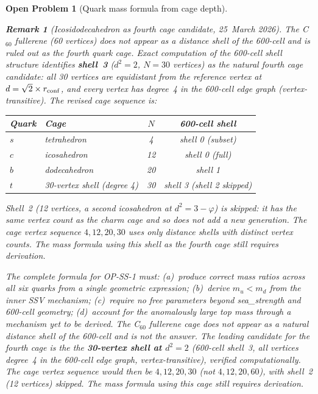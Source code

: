\documentclass[11pt,a4paper]{article}
\newtheorem{remark}[theorem]{Remark}
\newtheorem{openprob}[theorem]{Open Problem}
\newcommand{\phig}{\varphi}
\begin{document}
\begin{openprob}[Quark mass formula from cage depth]
\begin{remark}[Icosidodecahedron as fourth cage candidate, 25~March 2026]
The C$_{60}$ fullerene (60 vertices) does not appear as a distance
shell of the 600-cell and is ruled out as the fourth quark cage.
Exact computation of the 600-cell shell structure identifies
\textbf{shell~3} ($d^2 = 2$, $N = 30$ vertices) as the natural
fourth cage candidate: all 30 vertices are equidistant from the
reference vertex at $d = \sqrt{2}\times r_{\rm conf}$, and every
vertex has degree~4 in the 600-cell edge graph (vertex-transitive).
The revised cage sequence is:
\begin{center}
\renewcommand{\arraystretch}{1.2}
\begin{tabular}{llcc}
\toprule
Quark & Cage & $N$ & 600-cell shell \\
\midrule
$s$ & tetrahedron & 4 & shell 0 (subset) \\
$c$ & icosahedron & 12 & shell 0 (full) \\
$b$ & dodecahedron & 20 & shell 1 \\
$t$ & 30-vertex shell (degree 4) & 30 & shell 3 (shell 2 skipped) \\
\bottomrule
\end{tabular}
\end{center}
Shell~2 (12 vertices, a second icosahedron at $d^2 = 3-\phig$)
is skipped: it has the same vertex count as the charm cage and
so does not add a new generation.  The cage vertex sequence
$4, 12, 20, 30$ uses only distance shells with \emph{distinct}
vertex counts.  The mass formula using this shell as
the fourth cage still requires derivation.
\end{remark}

The complete formula for OP-SS-1 must: (a)~produce correct mass
ratios across all six quarks from a single geometric expression;
(b)~derive $m_u < m_d$ from the inner SSV mechanism; (c)~require
no free parameters beyond sea\_strength and 600-cell geometry;
(d)~account for the anomalously large top mass through a mechanism
yet to be derived.  The C$_{60}$ fullerene cage does not appear
as a natural distance shell of the 600-cell and is not the answer.
The leading candidate for the fourth cage is the
the \textbf{30-vertex shell at $d^2 = 2$} (600-cell shell~3,
all vertices degree~4 in the 600-cell edge graph,
vertex-transitive), verified computationally.  The cage vertex sequence would
then be $4, 12, 20, 30$ (not $4, 12, 20, 60$), with shell~2
(12 vertices) skipped.  The mass formula using this cage
still requires derivation.
\end{openprob}
\end{document}
